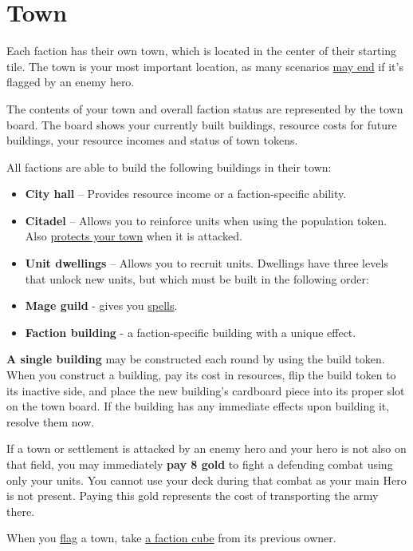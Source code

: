 \documentclass[12pt]{article}
\def\assets{assets}
\def\svgs{\assets/svgs}
\begin{document}
\section[Town]{Town\hypertarget{Town}{}}
Each faction has their own town, which is located in the center of their starting tile. The town is your most important location, as many scenarios \hyperlink{End}{may end} if it's flagged by an enemy hero.\par
The contents of your town and overall faction status are represented by the town board. The board shows your currently built buildings, resource costs for future buildings, your resource incomes and status of town tokens.\par
All factions are able to build the following buildings in their town:
\begin{itemize}
    \item \textbf{City hall} – Provides resource income or a faction-specific ability.
    \item \textbf{Citadel} – Allows you to reinforce units when using the population token. Also \hyperlink{Walls}{protects your town} when it is attacked.
    \item \textbf{Unit dwellings} – Allows you to recruit units. Dwellings have three levels that unlock new units, but which must be built in the following order:
    \item \textbf{Mage guild} - gives you \hyperlink{spells}{spells}.
    \item \textbf{Faction building} - a faction-specific building with a unique effect.
\end{itemize}
\textbf{A single building} may be constructed each round by using the build token. When you construct a building, pay its cost in resources, flip the build token to its inactive side, and place the new building’s cardboard piece into its proper slot on the town board. If the building has any immediate effects upon building it, resolve them now.\par
If a town or settlement is attacked by an enemy hero and your hero is not also on that field, you may immediately \textbf{pay 8 gold} to fight a defending combat using only your units. You cannot use your deck during that combat as your main Hero is not present. Paying this gold represents the cost of transporting the army there.\par
When you \hyperlink{Categories}{flag} a town, take \hyperlink{End}{a faction cube} from its previous owner.
\end{document}
